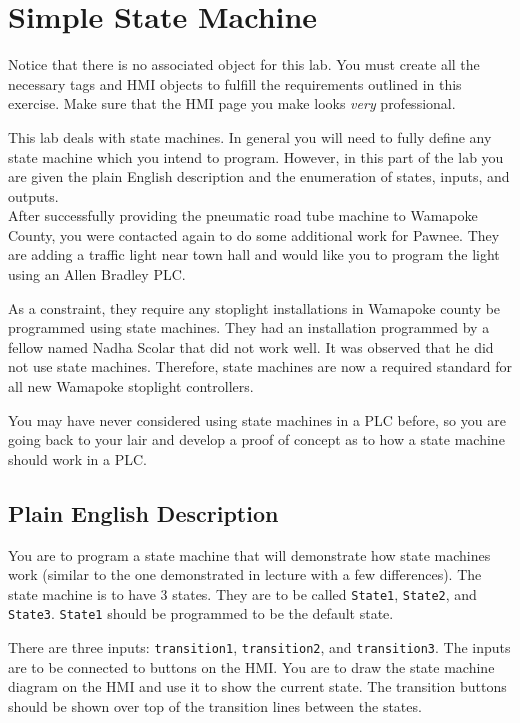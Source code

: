 

\section{Simple State Machine}
Notice that there is no associated object for this lab. You must create all the necessary tags and HMI objects to fulfill the requirements outlined in this exercise. Make sure that the HMI page you make looks \textit{very} professional. 

This lab deals with state machines. In general you will need to fully define any state machine which you intend to program. However, in this part of the lab you are given the plain English description and the enumeration of states, inputs, and outputs.
\\

After successfully providing the pneumatic road tube machine to Wamapoke County, you were contacted again to do some additional work for Pawnee. They are adding a traffic light near town hall and would like you to program the light using an Allen Bradley PLC. 

As a constraint, they require any stoplight installations in Wamapoke county be programmed using state machines. They had an installation programmed by a fellow named Nadha Scolar that did not work well. It was observed that he did not use state machines. Therefore, state machines are now a required standard for all new Wamapoke stoplight controllers.

You may have never considered using state machines in a PLC before, so you are going back to your lair and develop a proof of concept as to how a state machine should work in a PLC.




\subsection{Plain English Description}

You are to program a state machine that will demonstrate how state machines work (similar to the one demonstrated in lecture with a few differences). The state machine is to have 3 states. They are to be called \verb|State1|, \verb|State2|, and \verb|State3|. \verb|State1| should be programmed to be the default state.

There are three inputs: \verb|transition1|, \verb|transition2|, and \verb|transition3|. The inputs are to be connected to buttons on the HMI. You are to draw the state machine diagram on the HMI and use it to show the current state. The transition buttons should be shown over top of the transition lines between the states. 

